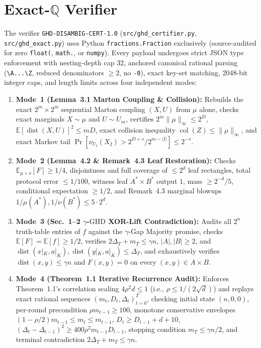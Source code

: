 \documentclass[10pt,twocolumn]{article}
\newcommand{\QQ}{\mathbb{Q}}
\newcommand{\EE}{\mathbb{E}}
\newcommand{\PP}{\Pr}
\newcommand{\dist}{\operatorname{dist}}
\newcommand{\col}{\operatorname{col}}
\newcommand{\GHD}{\mathrm{GHD}}
\begin{document}
\section{Exact-\texorpdfstring{$\QQ$}{Q} Verifier}\label{sec:cert}
The verifier \texttt{GHD-DISAMBIG-CERT-1.0} (\texttt{src/ghd\_certifier.py}, \texttt{src/ghd\_exact.py}) uses Python \texttt{fractions.Fraction} exclusively (source-audited for zero \texttt{float(}, \texttt{math.}, or \texttt{numpy}). Every payload undergoes strict JSON type enforcement with nesting-depth cap $32$, anchored canonical rational parsing (\texttt{\textbackslash A...\textbackslash Z}, reduced denominators $\ge 2$, no \texttt{-0}), exact key-set matching, 2048-bit integer caps, and length limits across four independent modes:
\begin{enumerate}[leftmargin=*,nosep]
  \item \textbf{Mode~1 (Lemma~3.1 Marton Coupling \& Collision):} Rebuilds the exact $2^m \times 2^m$ sequential Marton coupling $(X, U)$ from $\mu$ alone, checks exact marginals $X \sim \mu$ and $U \sim U_m$, certifies $2^m \|\mu\|_\infty \le 2^D$, $\EE[\dist(X,U)]^2 \le m D$, exact collision inequality $\col(Z) \le \|\mu\|_\infty$, and exact Markov tail $\PP[\nu_{U_I}(X_{\bar I}) > 2^{D+s}/2^{m-|I|}] \le 2^{-s}$.
  \item \textbf{Mode~2 (Lemma~4.2 \& Remark~4.3 Leaf Restoration):} Checks $\EE_{\mu\times\nu}[F] \ge 1/4$, disjointness and full coverage of $\le 2^d$ leaf rectangles, total protocol error $\le 1/100$, witness leaf $A^*\times B^*$ output $1$, mass $\ge 2^{-d}/5$, conditional expectation $\ge 1/2$, and Remark~4.3 marginal blowups $1/\mu(A^*), 1/\nu(B^*) \le 5 \cdot 2^d$.
  \item \textbf{Mode~3 (Sec.~1--2 $\gamma$-$\GHD$ XOR-Lift Contradiction):} Audits all $2^n$ truth-table entries of $f$ against the $\gamma$-Gap Majority promise, checks $\EE[F] = \EE[f] \ge 1/2$, verifies $2\Delta_T + m_T \le \gamma n$, $|A|, |B| \ge 2$, and $\dist(x|_K, a|_K), \dist(y|_K, a|_K) \le \Delta_T$, and exhaustively verifies $\dist(x,y) \le \gamma n$ and $F(x,y) = 0$ on every $(x,y) \in A \times B$.
  \item \textbf{Mode~4 (Theorem~1.1 Iterative Recurrence Audit):} Enforces Theorem~1.1's correlation scaling $4\rho^2 d \le 1$ (i.e., $\rho \le 1/(2\sqrt{d})$) and replays exact rational sequences $(m_t, D_t, \Delta_t)_{t=0}^T$, checking initial state $(n, 0, 0)$, per-round precondition $\rho m_{t-1} \ge 100$, monotone conservative envelopes $(1-\rho/2)m_{t-1} \le m_t \le m_{t-1}$, $D_t \ge D_{t-1} + d + 10$, $(\Delta_t - \Delta_{t-1})^2 \ge 400 \rho^2 m_{t-1} D_{t-1}$, stopping condition $m_T \le \gamma n/2$, and terminal contradiction $2\Delta_T + m_T \le \gamma n$.
\end{enumerate}
\end{document}
